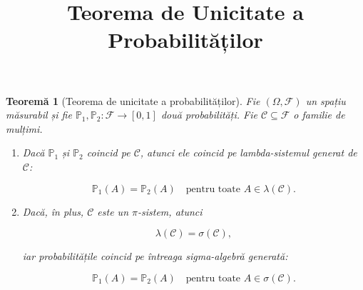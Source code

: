 \documentclass[12pt]{article}
\title{Teorema de Unicitate a Probabilităților}
\author{}
\date{}
\theoremstyle{plain}
\newtheorem{theorem}{Teoremă}
\begin{document}
\maketitle

\begin{theorem}[Teorema de unicitate a probabilităților]
Fie $(\Omega, \mathcal{F})$ un spațiu măsurabil și fie 
$\mathbb{P}_1, \mathbb{P}_2 : \mathcal{F} \to [0,1]$ două probabilități.
Fie $\mathcal{C} \subseteq \mathcal{F}$ o familie de mulțimi.

\begin{enumerate}
    \item Dacă $\mathbb{P}_1$ și $\mathbb{P}_2$ coincid pe $\mathcal{C}$, atunci ele coincid pe lambda-sistemul generat de $\mathcal{C}$:
    

\[
        \mathbb{P}_1(A) = \mathbb{P}_2(A)
        \quad \text{pentru toate } A \in \lambda(\mathcal{C}).
    \]



    \item Dacă, în plus, $\mathcal{C}$ este un $\pi$-sistem, atunci
    

\[
        \lambda(\mathcal{C}) = \sigma(\mathcal{C}),
    \]


    iar probabilitățile coincid pe întreaga sigma-algebră generată:
    

\[
        \mathbb{P}_1(A) = \mathbb{P}_2(A)
        \quad \text{pentru toate } A \in \sigma(\mathcal{C}).
    \]


\end{enumerate}
\end{theorem}
\end{document}

